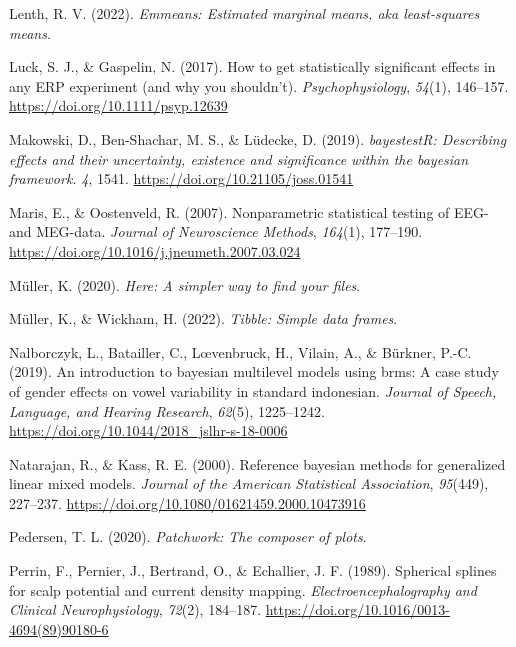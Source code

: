 \documentclass[
  man,floatsintext]{apa6}
\newlength{\cslhangindent}
\newlength{\cslentryspacingunit} %
\newenvironment{CSLReferences}[2] %
 {%
  \setlength{\parindent}{0pt}
  \ifodd #1
  \let\oldpar\par
  \def\par{\hangindent=\cslhangindent\oldpar}
  \fi
  \setlength{\parskip}{#2\cslentryspacingunit}
 }%
 {}
\begin{document}
\begin{CSLReferences}{1}{0}
\leavevmode{}%
Lenth, R. V. (2022). \emph{Emmeans: {Estimated} marginal means, aka least-squares means}.

\leavevmode{}%
Luck, S. J., \& Gaspelin, N. (2017). How to get statistically significant effects in any {ERP} experiment (and why you shouldn't). \emph{Psychophysiology}, \emph{54}(1), 146--157. \url{https://doi.org/10.1111/psyp.12639}

\leavevmode{}%
Makowski, D., Ben-Shachar, M. S., \& Lüdecke, D. (2019). \emph{{bayestestR}: {Describing} effects and their uncertainty, existence and significance within the bayesian framework.} \emph{4}, 1541. \url{https://doi.org/10.21105/joss.01541}

\leavevmode{}%
Maris, E., \& Oostenveld, R. (2007). Nonparametric statistical testing of {EEG-} and {MEG-data}. \emph{Journal of Neuroscience Methods}, \emph{164}(1), 177--190. \url{https://doi.org/10.1016/j.jneumeth.2007.03.024}

\leavevmode{}%
Müller, K. (2020). \emph{Here: {A} simpler way to find your files}.

\leavevmode{}%
Müller, K., \& Wickham, H. (2022). \emph{Tibble: {Simple} data frames}.

\leavevmode{}%
Nalborczyk, L., Batailler, C., Lœvenbruck, H., Vilain, A., \& Bürkner, P.-C. (2019). An introduction to bayesian multilevel models using brms: {A} case study of gender effects on vowel variability in standard indonesian. \emph{Journal of Speech, Language, and Hearing Research}, \emph{62}(5), 1225--1242. \url{https://doi.org/10.1044/2018_jslhr-s-18-0006}

\leavevmode{}%
Natarajan, R., \& Kass, R. E. (2000). Reference bayesian methods for generalized linear mixed models. \emph{Journal of the American Statistical Association}, \emph{95}(449), 227--237. \url{https://doi.org/10.1080/01621459.2000.10473916}

\leavevmode{}%
Pedersen, T. L. (2020). \emph{Patchwork: {The} composer of plots}.

\leavevmode{}%
Perrin, F., Pernier, J., Bertrand, O., \& Echallier, J. F. (1989). Spherical splines for scalp potential and current density mapping. \emph{Electroencephalography and Clinical Neurophysiology}, \emph{72}(2), 184--187. \url{https://doi.org/10.1016/0013-4694(89)90180-6}


\end{CSLReferences}
\end{document}
